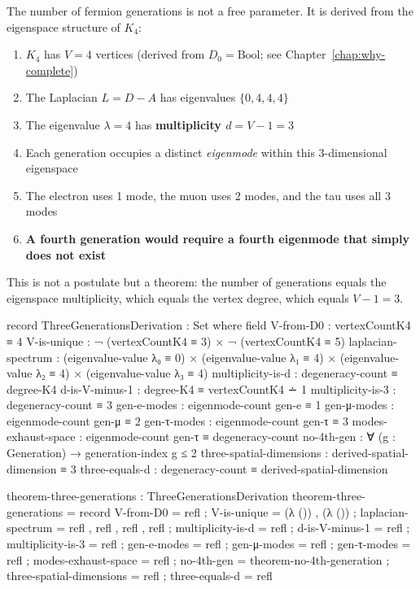 \documentclass[11pt,a4paper]{book}
\begin{document}
The number of fermion generations is not a free parameter. It is derived from the 
eigenspace structure of $K_4$:

\begin{enumerate}
\item $K_4$ has $V = 4$ vertices (derived from $D_0 = \text{Bool}$; see Chapter~\ref{chap:why-complete})
\item The Laplacian $L = D - A$ has eigenvalues $\{0, 4, 4, 4\}$
\item The eigenvalue $\lambda = 4$ has \textbf{multiplicity $d = V - 1 = 3$}
\item Each generation occupies a distinct \emph{eigenmode} within this 3-dimensional eigenspace
\item The electron uses 1 mode, the muon uses 2 modes, and the tau uses all 3 modes
\item \textbf{A fourth generation would require a fourth eigenmode that simply does not exist}
\end{enumerate}

This is not a postulate but a theorem: the number of generations equals the 
eigenspace multiplicity, which equals the vertex degree, which equals $V - 1 = 3$.

\begin{code}
record ThreeGenerationsDerivation : Set where
  field
    V-from-D0          : vertexCountK4 ≡ 4
    V-is-unique        : ¬ (vertexCountK4 ≡ 3) × ¬ (vertexCountK4 ≡ 5)
    laplacian-spectrum : (eigenvalue-value λ₀ ≡ 0) × 
                         (eigenvalue-value λ₁ ≡ 4) × 
                         (eigenvalue-value λ₂ ≡ 4) × 
                         (eigenvalue-value λ₃ ≡ 4)
    multiplicity-is-d  : degeneracy-count ≡ degree-K4
    d-is-V-minus-1     : degree-K4 ≡ vertexCountK4 ∸ 1
    multiplicity-is-3  : degeneracy-count ≡ 3
    gen-e-modes : eigenmode-count gen-e ≡ 1
    gen-μ-modes : eigenmode-count gen-μ ≡ 2
    gen-τ-modes : eigenmode-count gen-τ ≡ 3
    modes-exhaust-space : eigenmode-count gen-τ ≡ degeneracy-count
    no-4th-gen : ∀ (g : Generation) → generation-index g ≤ 2
    three-spatial-dimensions : derived-spatial-dimension ≡ 3
    three-equals-d           : degeneracy-count ≡ derived-spatial-dimension

theorem-three-generations : ThreeGenerationsDerivation
theorem-three-generations = record
  { V-from-D0          = refl
  ; V-is-unique        = (λ ()) , (λ ())
  ; laplacian-spectrum = refl , refl , refl , refl
  ; multiplicity-is-d  = refl
  ; d-is-V-minus-1     = refl
  ; multiplicity-is-3  = refl
  ; gen-e-modes        = refl
  ; gen-μ-modes        = refl
  ; gen-τ-modes        = refl
  ; modes-exhaust-space = refl
  ; no-4th-gen         = theorem-no-4th-generation
  ; three-spatial-dimensions = refl
  ; three-equals-d     = refl
  }
\end{code}
\end{document}
